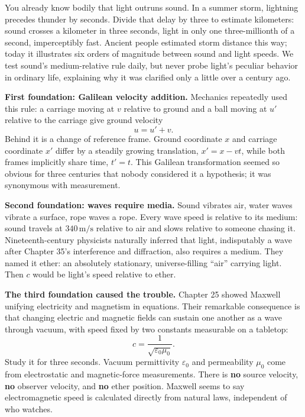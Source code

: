 You already know bodily that light outruns sound. In a summer storm, lightning precedes thunder by seconds. Divide that delay by three to estimate kilometers: sound crosses a kilometer in three seconds, light in only one three-millionth of a second, imperceptibly fast. Ancient people estimated storm distance this way; today it illustrates six orders of magnitude between sound and light speeds. We test sound's medium-relative rule daily, but never probe light's peculiar behavior in ordinary life, explaining why it was clarified only a little over a century ago.


\textbf{First foundation: Galilean velocity addition.} Mechanics repeatedly used this rule: a carriage moving at \(v\) relative to ground and a ball moving at \(u'\) relative to the carriage give ground velocity
\[
u=u'+v.
\]
Behind it is a change of reference frame. Ground coordinate \(x\) and carriage coordinate \(x'\) differ by a steadily growing translation, \(x'=x-vt\), while both frames implicitly share time, \(t'=t\). This Galilean transformation seemed so obvious for three centuries that nobody considered it a hypothesis; it was synonymous with measurement.

\textbf{Second foundation: waves require media.} Sound vibrates air, water waves vibrate a surface, rope waves a rope. Every wave speed is relative to its medium: sound travels at \(340\,\mathrm{m/s}\) relative to air and slows relative to someone chasing it. Nineteenth-century physicists naturally inferred that light, indisputably a wave after Chapter 35's interference and diffraction, also requires a medium. They named it ether: an absolutely stationary, universe-filling ``air'' carrying light. Then \(c\) would be light's speed relative to ether.

\textbf{The third foundation caused the trouble.} Chapter 25 showed Maxwell unifying electricity and magnetism in equations. Their remarkable consequence is that changing electric and magnetic fields can sustain one another as a wave through vacuum, with speed fixed by two constants measurable on a tabletop:
\[
c=\frac{1}{\sqrt{\varepsilon_0\mu_0}}.
\]
Study it for three seconds. Vacuum permittivity \(\varepsilon_0\) and permeability \(\mu_0\) come from electrostatic and magnetic-force measurements. There is \textbf{no} source velocity, \textbf{no} observer velocity, and \textbf{no} ether position. Maxwell seems to say electromagnetic speed is calculated directly from natural laws, independent of who watches.

